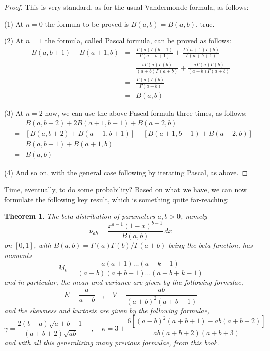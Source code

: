 \documentclass[12pt]{amsbook}
\newtheorem{theorem}{Theorem}[chapter]
\begin{document}
\begin{proof}
This is very standard, as for the usual Vandermonde formula, as follows:

\medskip

(1) At $n=0$ the formula to be proved is $B(a,b)=B(a,b)$, true.

\medskip

(2) At $n=1$ the formula, called Pascal formula, can be proved as follows:
\begin{eqnarray*}
B(a,b+1)+B(a+1,b)
&=&\frac{\Gamma(a)\Gamma(b+1)}{\Gamma(a+b+1)}+\frac{\Gamma(a+1)\Gamma(b)}{\Gamma(a+b+1)}\\
&=&\frac{b\Gamma(a)\Gamma(b)}{(a+b)\Gamma(a+b)}+\frac{a\Gamma(a)\Gamma(b)}{(a+b)\Gamma(a+b)}\\
&=&\frac{\Gamma(a)\Gamma(b)}{\Gamma(a+b)}\\
&=&B(a,b)
\end{eqnarray*}

(3) At $n=2$ now, we can use the above Pascal formula three times, as follows:
\begin{eqnarray*}
&&B(a,b+2)+2B(a+1,b+1)+B(a+2,b)\\
&=&[B(a,b+2)+B(a+1,b+1)]+[B(a+1,b+1)+B(a+2,b)]\\
&=&B(a,b+1)+B(a+1,b)\\
&=&B(a,b)
\end{eqnarray*}

(4) And so on, with the general case following by iterating Pascal, as above.
\end{proof}

Time, eventually, to do some probability? Based on what we have, we can now formulate the following key result, which is something quite far-reaching:


\begin{theorem}
The beta distribution of parameters $a,b>0$, namely
$$\nu_{ab}=\frac{x^{a-1}(1-x)^{b-1}}{B(a,b)}\,dx$$
on $[0,1]$, with $B(a,b)=\Gamma(a)\Gamma(b)/\Gamma(a+b)$ being the beta function, has moments
$$M_k=\frac{a(a+1)\ldots(a+k-1)}{(a+b)(a+b+1)\ldots(a+b+k-1)}$$
and in particular, the mean and variance are given by the following formulae,
$$E=\frac{a}{a+b}\quad,\quad V=\frac{ab}{(a+b)^2(a+b+1)}$$
and the skewness and kurtosis are given by the following formulae,
$$\gamma=\frac{2(b-a)\sqrt{a+b+1}}{(a+b+2)\sqrt{ab}}\quad,\quad
\kappa=3+\frac{6[(a-b)^2(a+b+1)-ab(a+b+2)]}{ab(a+b+2)(a+b+3)}$$
and with all this generalizing many previous formulae, from this book.
\end{theorem}
\end{document}
